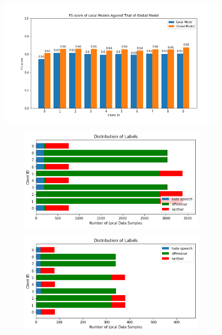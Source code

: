 \documentclass[letterpaper]{article} %
\begin{document}
\begin{figure}[hbt!]
{\includegraphics[width=\columnwidth]{iid-quantity-skew_seed_5performance_of_models_on_client_data_f1score}}
\caption{}
\end{figure}


\begin{figure}[hbt!]

\begin{subfigure}{\columnwidth}
{\includegraphics[width=\columnwidth]{noniid-quantity-based-label-imbalance-2_distribution_of_labels_2}}
\caption{}
\end{subfigure}

\begin{subfigure}{\columnwidth}
{\includegraphics[width=\columnwidth]{noniid-quantity-based-label-imbalance-2_test_set_distribution_of_labels_2}}
\caption{}
\end{subfigure}

\caption{}
\end{figure}
\end{document}

